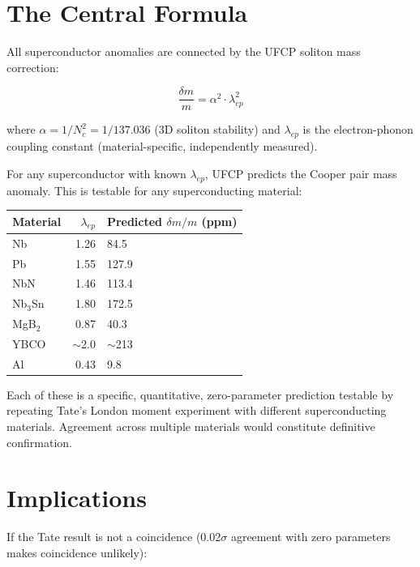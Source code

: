 \documentclass[11pt, a4paper]{article}
\begin{document}
\section{The Central Formula}

All superconductor anomalies are connected by the UFCP soliton
mass correction:

\begin{equation}
  \boxed{
  \frac{\delta m}{m} = \alpha^2 \cdot \lambda_{ep}^2
  }
  \label{eq:central}
\end{equation}

where $\alpha = 1/N_c^2 = 1/137.036$ (3D soliton stability)
and $\lambda_{ep}$ is the electron-phonon coupling constant
(material-specific, independently measured).

For any superconductor with known $\lambda_{ep}$, UFCP predicts
the Cooper pair mass anomaly. This is testable for any
superconducting material:

\begin{center}
\begin{tabular}{@{}lrl@{}}
\toprule
\textbf{Material} & $\lambda_{ep}$ &
\textbf{Predicted $\delta m/m$ (ppm)} \\
\midrule
Nb & 1.26 & 84.5 \\
Pb & 1.55 & 127.9 \\
NbN & 1.46 & 113.4 \\
Nb$_3$Sn & 1.80 & 172.5 \\
MgB$_2$ & 0.87 & 40.3 \\
YBCO & $\sim$2.0 & $\sim$213 \\
Al & 0.43 & 9.8 \\
\bottomrule
\end{tabular}
\end{center}

Each of these is a specific, quantitative, zero-parameter
prediction testable by repeating Tate's London moment experiment
with different superconducting materials. Agreement across
multiple materials would constitute definitive confirmation.

\section{Implications}

If the Tate result is not a coincidence (0.02$\sigma$ agreement
with zero parameters makes coincidence unlikely):
\end{document}
